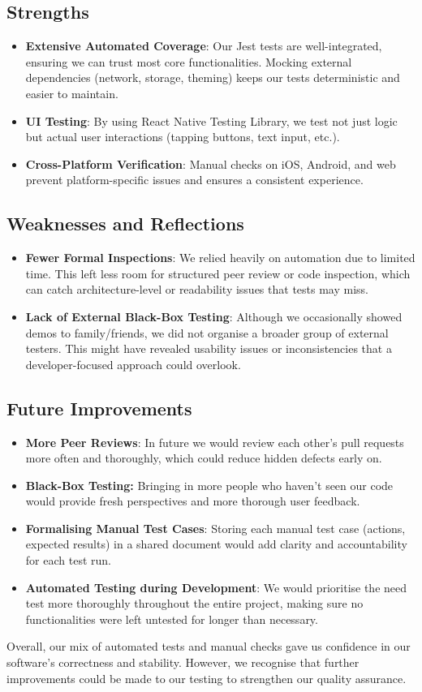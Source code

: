 \subsection{Strengths} \begin{itemize} \item \textbf{Extensive Automated Coverage}: Our Jest tests are well-integrated, ensuring we can trust most core functionalities. Mocking external dependencies (network, storage, theming) keeps our tests deterministic and easier to maintain. \item \textbf{UI Testing}: By using React Native Testing Library, we test not just logic but actual user interactions (tapping buttons, text input, etc.). \item \textbf{Cross-Platform Verification}: Manual checks on iOS, Android, and web prevent platform-specific issues and ensures a consistent experience. \end{itemize}

\subsection{Weaknesses and Reflections} \begin{itemize} \item \textbf{Fewer Formal Inspections}: We relied heavily on automation due to limited time. This left less room for structured peer review or code inspection, which can catch architecture-level or readability issues that tests may miss. \item \textbf{Lack of External Black-Box Testing}: Although we occasionally showed demos to family/friends, we did not organise a broader group of external testers. This might have revealed usability issues or inconsistencies that a developer-focused approach could overlook.\end{itemize}

\subsection{Future Improvements} \begin{itemize} \item \textbf{More Peer Reviews}: In future we would review each other’s pull requests more often and thoroughly, which could reduce hidden defects early on. \item \textbf{Black-Box Testing:} Bringing in more people who haven’t seen our code would provide fresh perspectives and more thorough user feedback. \item \textbf{Formalising Manual Test Cases}: Storing each manual test case (actions, expected results) in a shared document would add clarity and accountability for each test run.
\item \textbf{Automated Testing during Development}: We would prioritise the need test more thoroughly throughout the entire project, making sure no functionalities were left untested for longer than necessary.\end{itemize}

\noindent Overall, our mix of automated tests and manual checks gave us confidence in our software’s correctness and stability. However, we recognise that further improvements could be made to our testing to strengthen our quality assurance.